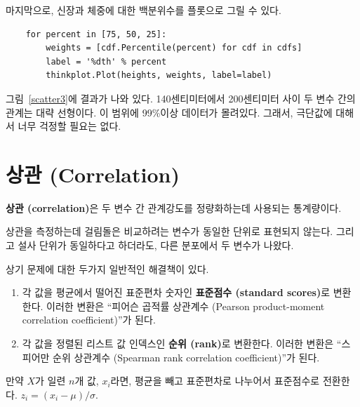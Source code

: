 마지막으로, 신장과 체중에 대한 백분위수를 플롯으로 그릴 수 있다.

\begin{verbatim}
    for percent in [75, 50, 25]:
        weights = [cdf.Percentile(percent) for cdf in cdfs]
        label = '%dth' % percent
        thinkplot.Plot(heights, weights, label=label)
\end{verbatim}

그림~\ref{scatter3}에 결과가 나와 있다.
140센티미터에서 200센티미터 사이 두 변수 간의 관계는 대략 선형이다.
이 범위에 99\%이상 데이터가 몰려있다. 그래서, 극단값에 대해서 너무 걱정할 필요는 없다.


\section{상관 (Correlation)}

{\bf 상관 (correlation)}은 두 변수 간 관계강도를 정량화하는데 사용되는 통계량이다.

상관을 측정하는데 걸림돌은 비교하려는 변수가 동일한 단위로 표현되지 않는다.
그리고 설사 단위가 동일하다고 하더라도, 다른 분포에서 두 변수가 나왔다.


상기 문제에 대한 두가지 일반적인 해결책이 있다.

\begin{enumerate}

\item 각 값을 평균에서 떨어진 표준편차 숫자인 {\bf 표준점수 (standard scores)}로 변환한다. 
이러한 변환은 ``피어슨 곱적률 상관계수 (Pearson product-moment correlation coefficient)''가 된다.

\item 각 값을 정렬된 리스트 값 인덱스인 {\bf 순위 (rank)}로 변환한다.
이러한 변환은 ``스피어만 순위 상관계수 (Spearman rank correlation coefficient)''가 된다.

\end{enumerate}

만약 $X$가 일련 $n$개 값, $x_i$라면, 평균을 빼고 표준편차로 나누어서  
표준점수로 전환한다.
$z_i = (x_i - \mu) / \sigma$.


